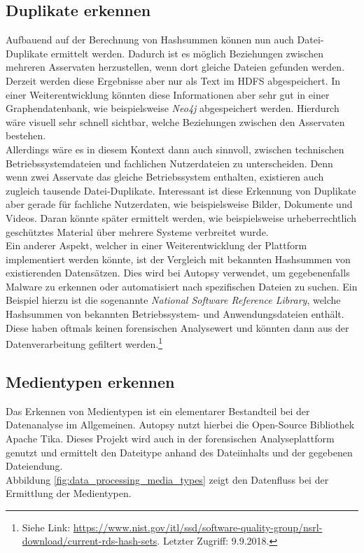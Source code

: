 \subsection{Duplikate erkennen}
\label{subsec:duplicate_files}
Aufbauend auf der Berechnung von Hashsummen können nun auch Datei-Duplikate ermittelt werden. Dadurch ist es möglich Beziehungen zwischen mehreren Asservaten herzustellen, wenn dort gleiche Dateien gefunden werden.\\
Derzeit werden diese Ergebnisse aber nur als Text im HDFS abgespeichert. In einer Weiterentwicklung könnten diese Informationen aber sehr gut in einer Graphendatenbank, wie beispielsweise \textit{Neo4j} abgespeichert werden. Hierdurch wäre visuell sehr schnell sichtbar, welche Beziehungen zwischen den Asservaten bestehen.\\ 
Allerdings wäre es in diesem Kontext dann auch sinnvoll, zwischen technischen Betriebssystemdateien und fachlichen Nutzerdateien zu unterscheiden. Denn wenn zwei Asservate das gleiche Betriebssystem enthalten, existieren auch zugleich tausende Datei-Duplikate. Interessant ist diese Erkennung von Duplikate aber gerade für fachliche Nutzerdaten, wie beispielsweise Bilder, Dokumente und Videos. Daran könnte später ermittelt werden, wie beispielsweise urheberrechtlich geschütztes Material über mehrere Systeme verbreitet wurde.\\

\noindent
Ein anderer Aspekt, welcher in einer Weiterentwicklung der Plattform implementiert werden könnte, ist der Vergleich mit bekannten Hashsummen von existierenden Datensätzen. Dies wird bei Autopsy verwendet, um gegebenenfalls Malware zu erkennen oder automatisiert nach spezifischen Dateien zu suchen. Ein Beispiel hierzu ist die sogenannte \textit{National Software Reference Library}, welche Hashsummen von bekannten Betriebssystem- und Anwendungsdateien enthält. Diese haben oftmals keinen forensischen Analysewert und könnten dann aus der Datenverarbeitung gefiltert werden.\footnote{Siehe Link: \url{https://www.nist.gov/itl/ssd/software-quality-group/nsrl-download/current-rds-hash-sets}. Letzter Zugriff: 9.9.2018.}\cite[S. 36]{digital_forensics}

\subsection{Medientypen erkennen}
\label{subsec:media_types}

Das Erkennen von Medientypen ist ein elementarer Bestandteil bei der Datenanalyse im Allgemeinen. Autopsy nutzt hierbei die Open-Source Bibliothek Apache Tika\texttrademark. Dieses Projekt wird auch in der forensischen Analyseplattform genutzt und ermittelt den Dateitype anhand des Dateiinhalts und der gegebenen Dateiendung.\\
Abbildung \ref{fig:data_processing_media_types} zeigt den Datenfluss bei der Ermittlung der Medientypen.\\

